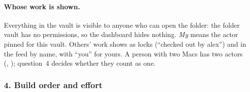 \paragraph{Whose work is shown.} Everything in the vault is visible to anyone who can open the folder: the folder vault has
no permissions, so the dashboard hides nothing. \emph{My} means the actor pinned for this vault. Others' work shows as locks
(``checked out by alex'') and in the feed by name, with ``you'' for yours. A person with two Macs has two actors
(, ); question~4 decides whether they count as one.

\subsubsection*{4. Build order and effort}

